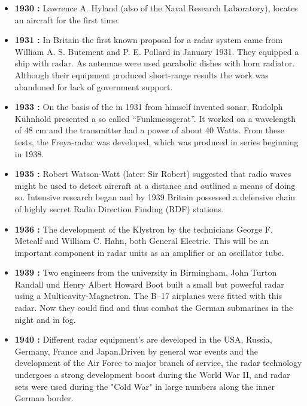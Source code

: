 \documentclass[14pt]{article} %
\begin{document}
\begin{itemize}
\item \textbf {1930 :  }Lawrence A. Hyland (also of the Naval Research Laboratory), locates an aircraft for the first time.

\item \textbf {1931 : }In Britain the first known proposal for a radar system came from William A. S. Butement and P. E. Pollard in January 1931. They equipped a ship with radar. As antennae were used parabolic dishes with horn radiator. Although their equipment produced short-range results the work was abandoned for lack of government support.

\item \textbf {1933 : }On the basis of the in 1931 from himself invented sonar, Rudolph Kühnhold presented a so called “Funkmessgerat”. It worked on a wavelength of 48 cm and the transmitter had a power of about 40 Watts. From these tests, the Freya-radar was developed, which was produced in series beginning in 1938.

\item \textbf {1935 : } Robert Watson-Watt (later: Sir Robert) suggested that radio waves might be used to detect aircraft at a distance and outlined a means of doing so. Intensive research began and by 1939 Britain possessed a defensive chain of highly secret Radio Direction Finding (RDF) stations.

\item \textbf {1936 :} The development of the Klystron by the technicians George F. Metcalf and William C. Hahn, both General Electric. This will be an important component in radar units as an amplifier or an oscillator tube.

\item \textbf {1939 : }Two engineers from the university in Birmingham, John Turton Randall und Henry Albert Howard Boot built a small but powerful radar using a Multicavity-Magnetron. The B–17 airplanes were fitted with this radar. Now they could find and thus combat the German submarines in the night and in fog.

\item \textbf {1940 :} Different radar equipment’s are developed in the USA, Russia, Germany, France and Japan.Driven by general war events and the development of the Air Force to major branch of service, the radar technology undergoes a strong development boost during the World War II, and radar sets were used during the "Cold War" in large numbers along the inner German border.
\end{itemize}
\end{document}
